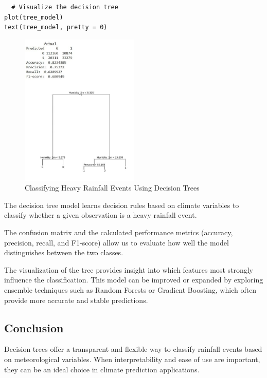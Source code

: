 \begin{verbatim}
  # Visualize the decision tree
plot(tree_model)
text(tree_model, pretty = 0)
\end{verbatim}

\begin{figure}[h]
\centering
\includegraphics[width=0.5\textwidth]{figures/tree.jpg}
\caption{Classifying Heavy Rainfall Events Using Decision Trees}
\end{figure}

The decision tree model learns decision rules based on climate variables to classify whether a given observation is a heavy rainfall event.

The confusion matrix and the calculated performance metrics (accuracy, precision, recall, and F1-score) allow us to evaluate how well the model distinguishes between the two classes.

The visualization of the tree provides insight into which features most strongly influence the classification. This model can be improved or expanded by exploring ensemble techniques such as Random Forests or Gradient Boosting, which often provide more accurate and stable predictions.

\subsection*{Conclusion}

Decision trees offer a transparent and flexible way to classify rainfall events based on meteorological variables. When interpretability and ease of use are important, they can be an ideal choice in climate prediction applications.
